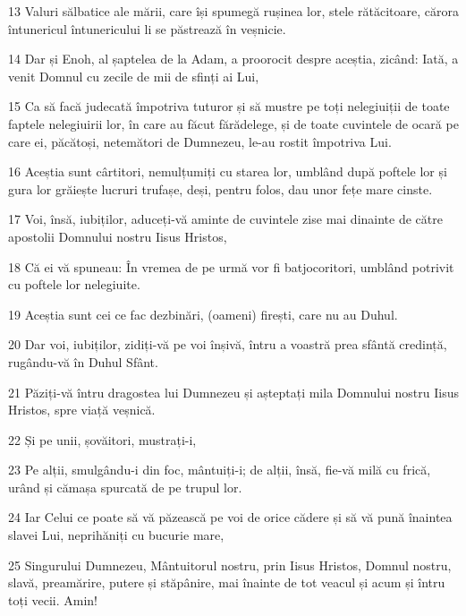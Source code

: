 \par 13 Valuri sălbatice ale mării, care își spumegă rușinea lor, stele rătăcitoare, cărora întunericul întunericului li se păstrează în veșnicie.
\par 14 Dar și Enoh, al șaptelea de la Adam, a proorocit despre aceștia, zicând: Iată, a venit Domnul cu zecile de mii de sfinți ai Lui,
\par 15 Ca să facă judecată împotriva tuturor și să mustre pe toți nelegiuiții de toate faptele nelegiuirii lor, în care au făcut fărădelege, și de toate cuvintele de ocară pe care ei, păcătoși, netemători de Dumnezeu, le-au rostit împotriva Lui.
\par 16 Aceștia sunt cârtitori, nemulțumiți cu starea lor, umblând după poftele lor și gura lor grăiește lucruri trufașe, deși, pentru folos, dau unor fețe mare cinste.
\par 17 Voi, însă, iubiților, aduceți-vă aminte de cuvintele zise mai dinainte de către apostolii Domnului nostru Iisus Hristos,
\par 18 Că ei vă spuneau: În vremea de pe urmă vor fi batjocoritori, umblând potrivit cu poftele lor nelegiuite.
\par 19 Aceștia sunt cei ce fac dezbinări, (oameni) firești, care nu au Duhul.
\par 20 Dar voi, iubiților, zidiți-vă pe voi înșivă, întru a voastră prea sfântă credință, rugându-vă în Duhul Sfânt.
\par 21 Păziți-vă întru dragostea lui Dumnezeu și așteptați mila Domnului nostru Iisus Hristos, spre viață veșnică.
\par 22 Și pe unii, șovăitori, mustrați-i,
\par 23 Pe alții, smulgându-i din foc, mântuiți-i; de alții, însă, fie-vă milă cu frică, urând și cămașa spurcată de pe trupul lor.
\par 24 Iar Celui ce poate să vă păzească pe voi de orice cădere și să vă pună înaintea slavei Lui, neprihăniți cu bucurie mare,
\par 25 Singurului Dumnezeu, Mântuitorul nostru, prin Iisus Hristos, Domnul nostru, slavă, preamărire, putere și stăpânire, mai înainte de tot veacul și acum și întru toți vecii. Amin!


